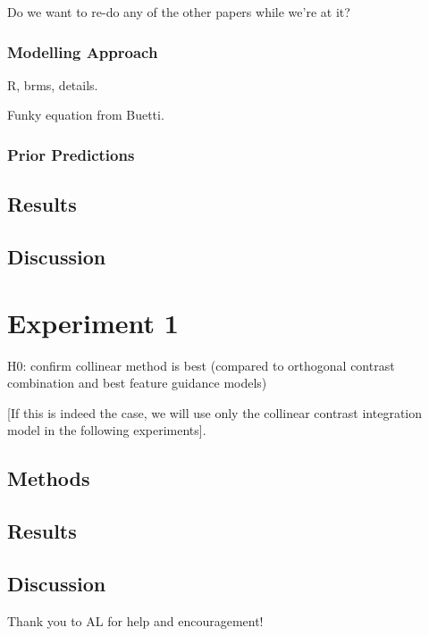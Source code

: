 Do we want to re-do any of the other papers while we're at it?

\subsubsection{Modelling Approach}

R, brms, details.

Funky equation from Buetti. 

\subsubsection{Prior Predictions}

\subsection{Results}

\subsection{Discussion}


\section{Experiment 1}

H0: confirm collinear method is best (compared to orthogonal contrast combination and best feature guidance models)

[If this is indeed the case, we will use only the collinear contrast integration model in the following experiments].

\subsection{Methods}

\subsection{Results}

\subsection{Discussion}



\begin{acknowledgements}
Thank you to AL for help and encouragement! 
\end{acknowledgements}


